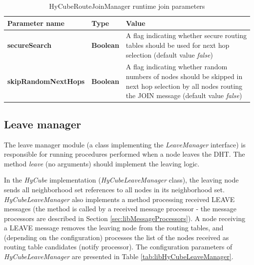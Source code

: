 \begin{table}
\scriptsize
\begin{center}
\begin{tabular}{p{2.5cm} p{2cm} p{10cm}}
	\hline
	\textbf{Parameter name}					& \textbf{Type}					& \textbf{Value}					\\[1mm]
    \hline
	\textbf{secureSearch}					& \textbf{Boolean}				& A flag indicating whether secure routing tables should be used for next hop selection (default value \emph{false})			\\[1.5mm]
	\textbf{skipRandomNextHops}				& \textbf{Boolean}				& A flag indicating whether random numbers of nodes should be skipped in next hop selection by all nodes routing the JOIN message (default value \emph{false})		\\[1.5mm]
    \hline
\end{tabular}
\end{center}
\caption{HyCubeRouteJoinManager runtime join parameters}
\label{tab:libHyCubeRouteJoinManagerJoinParameters}
\end{table}







\subsection{Leave manager}

The leave manager module (a class implementing the \emph{LeaveManager} interface) is responsible for running procedures performed when a node leaves the DHT. The method \emph{leave} (no arguments) should implement the leaving logic.

In the \emph{HyCube} implementation (\emph{HyCubeLeaveManager} class), the leaving node sends all neighborhood set references to all nodes in its neighborhood set. \emph{HyCubeLeaveManager} also implements a method processing received LEAVE messages (the method is called by a received message processor - the message processors are described in Section \ref{sec:libMessageProcessors}). A node receiving a LEAVE message removes the leaving node from the routing tables, and (depending on the configuration) processes the list of the nodes received as routing table candidates (notify processor). The configuration parameters of \emph{HyCubeLeaveManager} are presented in Table \ref{tab:libHyCubeLeaveManager}.

